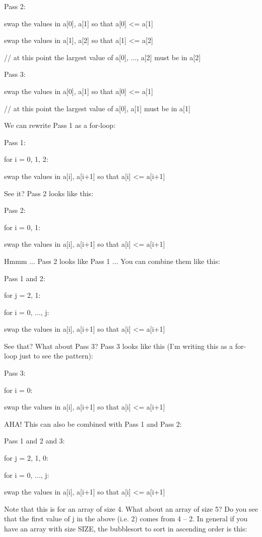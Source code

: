 \documentclass[
]{article}
\begin{document}
Pass 2:

swap the values in a{[}0{]}, a{[}1{]} so that a{[}0{]} \textless=
a{[}1{]}

swap the values in a{[}1{]}, a{[}2{]} so that a{[}1{]} \textless=
a{[}2{]}

// at this point the largest value of a{[}0{]}, ..., a{[}2{]} must be in
a{[}2{]}

Pass 3:

swap the values in a{[}0{]}, a{[}1{]} so that a{[}0{]} \textless=
a{[}1{]}

// at this point the largest value of a{[}0{]}, a{[}1{]} must be in
a{[}1{]}

We can rewrite Pass 1 as a for-loop:

Pass 1:

for i = 0, 1, 2:

swap the values in a{[}i{]}, a{[}i+1{]} so that a{[}i{]} \textless=
a{[}i+1{]}

See it? Pass 2 looks like this:

Pass 2:

for i = 0, 1:

swap the values in a{[}i{]}, a{[}i+1{]} so that a{[}i{]} \textless=
a{[}i+1{]}

Hmmm ... Pass 2 looks like Pass 1 ... You can combine them like this:

Pass 1 and 2:

for j = 2, 1:

for i = 0, ..., j:

swap the values in a{[}i{]}, a{[}i+1{]} so that a{[}i{]} \textless=
a{[}i+1{]}

See that? What about Pass 3? Pass 3 looks like this (I'm writing this as
a for-loop just to see the pattern):

Pass 3:

for i = 0:

swap the values in a{[}i{]}, a{[}i+1{]} so that a{[}i{]} \textless=
a{[}i+1{]}

AHA! This can also be combined with Pass 1 and Pass 2:

Pass 1 and 2 and 3:

for j = 2, 1, 0:

for i = 0, ..., j:

swap the values in a{[}i{]}, a{[}i+1{]} so that a{[}i{]} \textless=
a{[}i+1{]}

Note that this is for an array of size 4. What about an array of size 5?
Do you see that the first value of j in the above (i.e. 2) comes from 4
-- 2. In general if you have an array with size SIZE, the bubblesort to
sort in ascending order is this:
\end{document}
